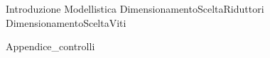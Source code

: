 \documentclass{miaclasse}
\begin{document}
\primapag

\pagestyle{fancy}







{Introduzione}
{Modellistica}
{DimensionamentoSceltaRiduttori}
{DimensionamentoSceltaViti}

\appendix
{Appendice_controlli}
\end{document}
